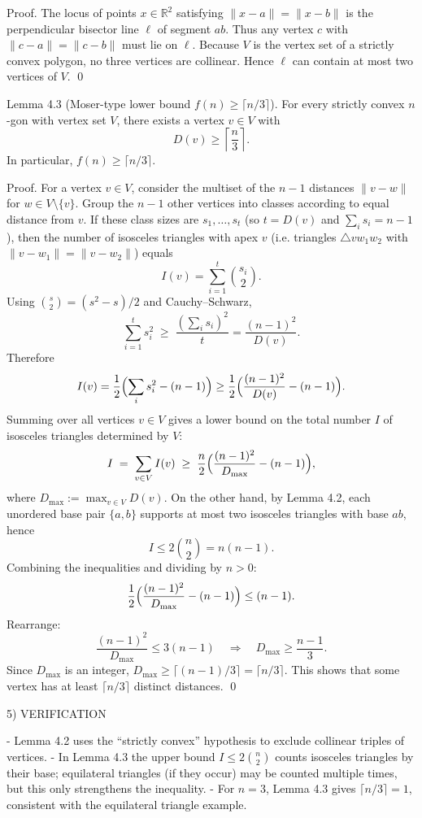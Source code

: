 Proof.
The locus of points $x\in\mathbb R^2$ satisfying $\|x-a\|=\|x-b\|$ is the perpendicular bisector line $\ell$ of segment $ab$.
Thus any vertex $c$ with $\|c-a\|=\|c-b\|$ must lie on $\ell$.
Because $V$ is the vertex set of a strictly convex polygon, no three vertices are collinear.
Hence $\ell$ can contain at most two vertices of $V$. \qed

Lemma 4.3 (Moser-type lower bound $f(n)\ge \lceil n/3\rceil$).
For every strictly convex $n$-gon with vertex set $V$, there exists a vertex $v\in V$ with
\[
D(v)\ge \left\lceil\frac{n}{3}\right\rceil.
\]
In particular, $f(n)\ge \lceil n/3\rceil$.

Proof.
For a vertex $v\in V$, consider the multiset of the $n-1$ distances $\|v-w\|$ for $w\in V\setminus\{v\}$.
Group the $n-1$ other vertices into classes according to equal distance from $v$.
If these class sizes are $s_1,\dots,s_t$ (so $t=D(v)$ and $\sum_i s_i=n-1$), then the number of isosceles triangles with apex $v$ (i.e. triangles $\triangle v w_1 w_2$ with $\|v-w_1\|=\|v-w_2\|$) equals
\[
I(v)=\sum_{i=1}^t \binom{s_i}{2}.
\]
Using $\binom{s}{2}=(s^2-s)/2$ and Cauchy--Schwarz,
\[
\sum_{i=1}^t s_i^2\;\ge\;\frac{(\sum_i s_i)^2}{t}=\frac{(n-1)^2}{D(v)}.
\]
Therefore
\[
I(v)=\frac12\Bigl(\sum_i s_i^2-(n-1)\Bigr)\ge \frac12\Bigl(\frac{(n-1)^2}{D(v)}-(n-1)\Bigr).
\]
Summing over all vertices $v\in V$ gives a lower bound on the total number $I$ of isosceles triangles determined by $V$:
\[
I\;=\;\sum_{v\in V} I(v)\;\ge\;\frac{n}{2}\Bigl(\frac{(n-1)^2}{D_{\max}}-(n-1)\Bigr),
\]
where $D_{\max}:=\max_{v\in V}D(v)$.
On the other hand, by Lemma 4.2, each unordered base pair $\{a,b\}$ supports at most two isosceles triangles with base $ab$, hence
\[
I\le 2\binom{n}{2}=n(n-1).
\]
Combining the inequalities and dividing by $n>0$:
\[
\frac12\Bigl(\frac{(n-1)^2}{D_{\max}}-(n-1)\Bigr)\le (n-1).
\]
Rearrange:
\[
\frac{(n-1)^2}{D_{\max}}\le 3(n-1)\quad\Rightarrow\quad D_{\max}\ge \frac{n-1}{3}.
\]
Since $D_{\max}$ is an integer, $D_{\max}\ge \lceil (n-1)/3\rceil=\lceil n/3\rceil$.
This shows that some vertex has at least $\lceil n/3\rceil$ distinct distances. \qed

5) VERIFICATION

- Lemma 4.2 uses the ``strictly convex'' hypothesis to exclude collinear triples of vertices.
- In Lemma 4.3 the upper bound $I\le 2\binom{n}{2}$ counts isosceles triangles by their base; equilateral triangles (if they occur) may be counted multiple times, but this only strengthens the inequality.
- For $n=3$, Lemma 4.3 gives $\lceil n/3\rceil=1$, consistent with the equilateral triangle example.

